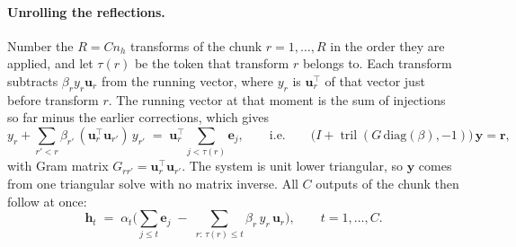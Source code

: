 \documentclass[10pt]{article}
\newcommand{\bu}{\mathbf{u}}
\newcommand{\bh}{\mathbf{h}}
\newcommand{\be}{\mathbf{e}}
\newcommand{\by}{\mathbf{y}}
\begin{document}
\paragraph{Unrolling the reflections.} Number the $R=Cn_h$ transforms of the chunk $r=1,\dots,R$ in the
order they are applied, and let $\tau(r)$ be the token that transform $r$ belongs to. Each transform
subtracts $\beta_r y_r\bu_r$ from the running vector, where $y_r$ is $\bu_r^\top$ of that vector just
before transform $r$. The running vector at that moment is the sum of injections so far minus the
earlier corrections, which gives
\begin{equation}
  y_r + \sum_{r'<r}\beta_{r'}\,(\bu_r^\top\bu_{r'})\,y_{r'} \;=\; \bu_r^\top\!\!\sum_{j<\tau(r)}\be_j ,
  \qquad\text{i.e.}\qquad
  \big(I+\operatorname{tril}(G\,\mathrm{diag}(\beta),-1)\big)\,\by = \mathbf{r},
  \label{eq:tri}
\end{equation}
with Gram matrix $G_{rr'}=\bu_r^\top\bu_{r'}$. The system is unit lower triangular, so $\by$ comes from
one triangular solve with no matrix inverse. All $C$ outputs of the chunk then follow at once:
\begin{equation}
  \bh_t \;=\; \alpha_t\Big(\sum_{j\le t}\be_j \;-\; \sum_{r:\,\tau(r)\le t}\beta_r\,y_r\,\bu_r\Big),
  \qquad t=1,\dots,C.
  \label{eq:chunkout}
\end{equation}
\end{document}
